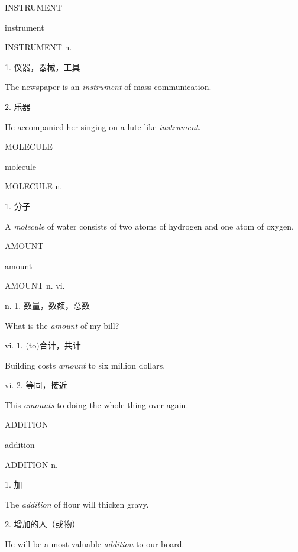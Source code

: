\begin{flashcard}{
INSTRUMENT

instrument
}
\begin{center}
INSTRUMENT n. 
\end{center}
1. 仪器，器械，工具

The newspaper is an \textit{instrument} of mass communication.

2. 乐器

He accompanied her singing on a lute-like \textit{instrument}.

\end{flashcard}
\begin{flashcard}{
MOLECULE

molecule
}
\begin{center}
MOLECULE n. 
\end{center}
1. 分子

A \textit{molecule} of water consists of two atoms of hydrogen and one atom of oxygen.

\end{flashcard}
\begin{flashcard}{
AMOUNT

amount
}
\begin{center}
AMOUNT n. vi. 
\end{center}
n. 1. 数量，数额，总数

What is the \textit{amount} of my bill?

vi. 1. (to)合计，共计

Building costs \textit{amount} to six million dollars.

vi. 2. 等同，接近

This \textit{amounts} to doing the whole thing over again.

\end{flashcard}
\begin{flashcard}{
ADDITION

addition
}
\begin{center}
ADDITION n. 
\end{center}
1. 加

The \textit{addition} of flour will thicken gravy.

2. 增加的人（或物）

He will be a most valuable \textit{addition} to our board.

\end{flashcard}
